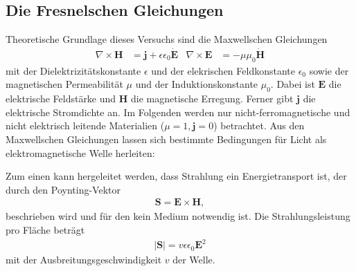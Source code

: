 \subsection{Die Fresnelschen Gleichungen}
Theoretische Grundlage dieses Versuchs sind die Maxwellschen Gleichungen
\begin{align}
    \nabla \times \symbf{H} &= \symbf{j} + \epsilon \epsilon_0 \dot{\symbf{E}}
     & \nabla \times \symbf{E} &= - \mu \mu_0 \dot{\symbf{H}}
\end{align}
mit der Dielektrizitätskonstante $\epsilon$ und der elekrischen Feldkonstante $\epsilon_0$ sowie der magnetischen Permeabilität $\mu$ und der Induktionskonstante $\mu_0$.
Dabei ist $\symbf{E}$ die elektrische Feldstärke und $\symbf{H}$ die magnetische Erregung.
Ferner gibt $\symbf{j}$ die elektrische Stromdichte an.
Im Folgenden werden nur nicht-ferromagnetische und nicht elektrisch leitende Materialien ($\mu = 1, \symbf{j} = 0$) betrachtet.
Aus den Maxwellschen Gleichungen lassen sich bestimmte Bedingungen für Licht als elektromagnetische Welle herleiten:

\noindent
Zum einen kann hergeleitet werden, dass Strahlung ein Energietransport ist, der durch den Poynting-Vektor
\begin{align}
    \symbf{S} = \symbf{E} \times \symbf{H},
    \label{eq:poynting}
\end{align}
beschrieben wird und für den kein Medium notwendig ist.
Die Strahlungsleistung pro Fläche beträgt
\begin{align}
    \left|\symbf{S}\right| = v \epsilon \epsilon_0 \symbf{E}^2
    \label{eq:leistung}
\end{align}
mit der Ausbreitungsgeschwindigkeit $v$ der Welle.

